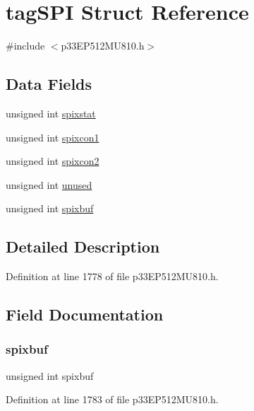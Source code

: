 \hypertarget{structtag_s_p_i}{}\section{tag\+S\+PI Struct Reference}
\label{structtag_s_p_i}


{\ttfamily \#include $<$p33\+E\+P512\+M\+U810.\+h$>$}

\subsection*{Data Fields}
\begin{DoxyCompactItemize}
\item 
unsigned int \hyperlink{structtag_s_p_i_abef89a15a5da0a184b4f3c8605131827}{spixstat}
\item 
unsigned int \hyperlink{structtag_s_p_i_a91ad3051fa8851d3a39f5178b40b6ca5}{spixcon1}
\item 
unsigned int \hyperlink{structtag_s_p_i_a2e1664d721667038d3117ae858fc85c4}{spixcon2}
\item 
unsigned int \hyperlink{structtag_s_p_i_a1902ff28c01f8dab73ffed44a642ae6a}{unused}
\item 
unsigned int \hyperlink{structtag_s_p_i_a5fa797701de92c992d6451c5817a47bd}{spixbuf}
\end{DoxyCompactItemize}


\subsection{Detailed Description}


Definition at line 1778 of file p33\+E\+P512\+M\+U810.\+h.



\subsection{Field Documentation}
\mbox{\label{structtag_s_p_i_a5fa797701de92c992d6451c5817a47bd}} 
\subsubsection{\texorpdfstring{spixbuf}{spixbuf}}
{\footnotesize\ttfamily unsigned int spixbuf}



Definition at line 1783 of file p33\+E\+P512\+M\+U810.\+h.

